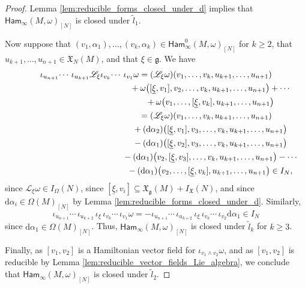 \documentclass[10pt,a4paper]{amsart}
\numberwithin{equation}{section}
\newcommand{\g}{\mathfrak{g}}
\newcommand{\Ham}{\mathsf{Ham}}
\newcommand{\fgmodule}{\mathfrak{X}_{\g}}
\newcommand{\vanvf}{I_{\mathfrak{X}}(N)}%
\renewcommand{\L}{\mathscr{L}}
\newcommand{\X}{\mathfrak{X}}
\renewcommand{\subset}{\subseteq}
\renewcommand{\d}{\mathrm{d}}
\begin{document}
\begin{proof}
	Lemma \ref{lem:reducible_forms_closed_under_d} implies that $\Ham_\infty(M,\omega)_{[N]}$ is closed under $\tilde{l}_1$.

Now suppose that $(v_1,\alpha_1),\dots,(v_k,\alpha_k)\in \Ham_\infty^0(M,\omega)_{[N]}$ for $k\geq 2$, that $u_{k+1},\dots,u_{n+1}\in\X_N(M)$, and that $\xi\in\g$. We have
\begin{gather*}
\iota_{u_{n+1}}\!\cdots\,\iota_{u_{k+1}}\L_\xi\iota_{v_k}\!\cdots\,\iota_{v_1}\omega
=	(\L_\xi\omega)(v_1,\dots,v_k,u_{k+1},\dots,u_{n+1})			             \\ \hphantom{\iota_{u_{n+1}}\!\cdots\,\iota_{u_{k+1}}\L_\xi\iota_{v_k}\!\cdots\,\iota_{v_1}\omega=}{}
+\omega\bigl([\underline\xi,v_1],v_2,\dots,v_k,u_{k+1},\dots,u_{n+1}\bigr)  +\cdots   \\  \hphantom{\iota_{u_{n+1}}\!\cdots\,\iota_{u_{k+1}}\L_\xi\iota_{v_k}\!\cdots\,\iota_{v_1}\omega=}{}
+\omega\bigl(v_1,\dots,[\underline\xi,v_k],u_{k+1},\dots,u_{n+1}\bigr)         \\ \hphantom{\iota_{u_{n+1}}\!\cdots\,\iota_{u_{k+1}}\L_\xi\iota_{v_k}\!\cdots\,\iota_{v_1}\omega}{}
=	(\L_\xi\omega)(v_1,\dots,v_k,u_{k+1},\dots,u_{n+1})		               	 \\ \hphantom{\iota_{u_{n+1}}\!\cdots\,\iota_{u_{k+1}}\L_\xi\iota_{v_k}\!\cdots\,\iota_{v_1}\omega=}{}
+(\d\alpha_2)\bigl([\underline\xi,v_1],v_3,\dots,v_k,u_{k+1},\dots,u_{n+1}\bigr)       \\ \hphantom{\iota_{u_{n+1}}\!\cdots\,\iota_{u_{k+1}}\L_\xi\iota_{v_k}\!\cdots\,\iota_{v_1}\omega=}{}
-(\d\alpha_1)\bigl([\underline\xi,v_2],v_3,\dots,v_k,u_{k+1},\dots,u_{n+1}\bigr)	     \\ \hphantom{\iota_{u_{n+1}}\!\cdots\,\iota_{u_{k+1}}\L_\xi\iota_{v_k}\!\cdots\,\iota_{v_1}\omega=}{}
-(\d\alpha_1)\bigl(v_2,[\underline\xi,v_3],\dots,v_k,u_{k+1},\dots,u_{n+1}\bigr)    -\cdots 	 \\ \hphantom{\iota_{u_{n+1}}\!\cdots\,\iota_{u_{k+1}}\L_\xi\iota_{v_k}\!\cdots\,\iota_{v_1}\omega=}{}
-(\d\alpha_1)\bigl(v_2,\dots,[\underline\xi,v_k],u_{k+1},\dots,u_{n+1}\bigr)
\in I_N,
	\end{gather*}
	since $\L_\xi\omega\in I_\Omega(N)$, since $[\underline\xi,v_i]\subset\fgmodule(M) + \vanvf$, and since $\d\alpha_i\in\Omega(M)_{[N]}$ by Lemma \ref{lem:reducible_forms_closed_under_d}. Similarly,
	\[
		\iota_{u_{n+1}}\!\cdots\,\iota_{u_{k+2}}\,\iota_\xi\,\iota_{v_k}\!\cdots\,\iota_{v_1}\omega
			= - \iota_{u_{n+1}}\!\cdots\,\iota_{u_{k+2}}\,\iota_\xi\,\iota_{v_k}\!\cdots\,\iota_{v_2}\d\alpha_1
			\in I_N
	\]
	since $\d\alpha_1\in\Omega(M)_{[N]}$. Thus, $\Ham_\infty(M,\omega)_{[N]}$ is closed under $\tilde{l}_k$ for $k\geq 3$.

	Finally, as $[v_1,v_2]$ is a Hamiltonian vector field for $\iota_{v_1\wedge v_2}\omega$, and as $[v_1,v_2]$ is reducible by Lemma \ref{lem:reducible_vector_fields_Lie_algebra}, we conclude that $\Ham_\infty(M,\omega)_{[N]}$ is closed under $\tilde{l}_2$.
\end{proof}
\end{document}
